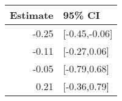 \begin{tabular}{rl}
  \hline
Estimate & 95\% CI \\ 
  \hline
-0.25 & [-0.45,-0.06] \\ 
  -0.11 & [-0.27,0.06] \\ 
  -0.05 & [-0.79,0.68] \\ 
  0.21 & [-0.36,0.79] \\ 
   \hline
\end{tabular}


